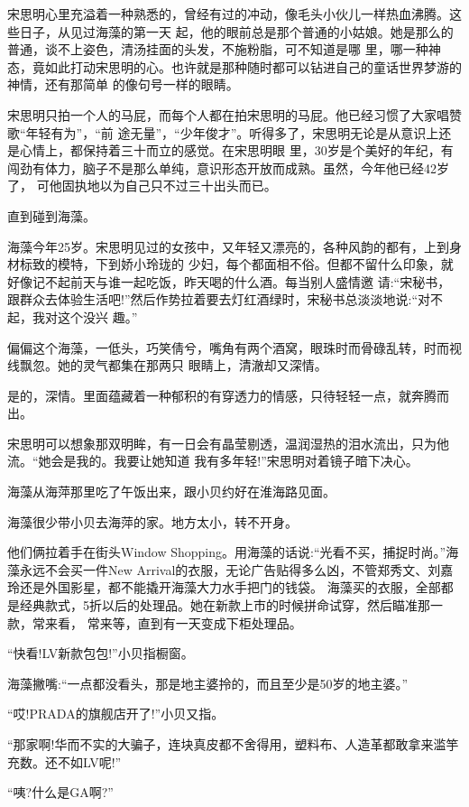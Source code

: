 \documentclass[11pt,a4paper,onecolumn]{article}
\begin{document}
宋思明心里充溢着一种熟悉的，曾经有过的冲动，像毛头小伙儿一样热血沸腾。这些日子，从见过海藻的第一天
起，他的眼前总是那个普通的小姑娘。她是那么的普通，谈不上姿色，清汤挂面的头发，不施粉脂，可不知道是哪
里，哪一种神态，竟如此打动宋思明的心。也许就是那种随时都可以钻进自己的童话世界梦游的神情，还有那简单
的像句号一样的眼睛。

宋思明只拍一个人的马屁，而每个人都在拍宋思明的马屁。他已经习惯了大家唱赞歌\myrule ``年轻有为''，``前
途无量''，``少年俊才''。听得多了，宋思明无论是从意识上还是心情上，都保持着三十而立的感觉。在宋思明眼
里，30岁是个美好的年纪，有闯劲有体力，脑子不是那么单纯，意识形态开放而成熟。虽然，今年他已经42岁了，
可他固执地以为自己只不过三十出头而已。

直到碰到海藻。

海藻今年25岁。宋思明见过的女孩中，又年轻又漂亮的，各种风韵的都有，上到身材标致的模特，下到娇小玲珑的
少妇，每个都面相不俗。但都不留什么印象，就好像记不起前天与谁一起吃饭，昨天喝的什么酒。每当别人盛情邀
请:``宋秘书，跟群众去体验生活吧!''然后作势拉着要去灯红酒绿时，宋秘书总淡淡地说:``对不起，我对这个没兴
趣。''

偏偏这个海藻，一低头，巧笑倩兮，嘴角有两个酒窝，眼珠时而骨碌乱转，时而视线飘忽。她的灵气都集在那两只
眼睛上，清澈却又深情。

是的，深情。里面蕴藏着一种郁积的有穿透力的情感，只待轻轻一点，就奔腾而出。

宋思明可以想象那双明眸，有一日会有晶莹剔透，温润湿热的泪水流出，只为他流。``她会是我的。我要让她知道
我有多年轻!''宋思明对着镜子暗下决心。

海藻从海萍那里吃了午饭出来，跟小贝约好在淮海路见面。

海藻很少带小贝去海萍的家。地方太小，转不开身。

他们俩拉着手在街头Window Shopping。用海藻的话说:``光看不买，捕捉时尚。''海藻永远不会买一件New
Arrival的衣服，无论广告贴得多么凶，不管郑秀文、刘嘉玲还是外国影星，都不能撬开海藻大力水手把门的钱袋。
海藻买的衣服，全部都是经典款式，5折以后的处理品。她在新款上市的时候拼命试穿，然后瞄准那一款，常来看，
常来等，直到有一天变成下柜处理品。

``快看!LV新款包包!''小贝指橱窗。

海藻撇嘴:``一点都没看头，那是地主婆拎的，而且至少是50岁的地主婆。''

``哎!PRADA的旗舰店开了!''小贝又指。

``那家啊!华而不实的大骗子，连块真皮都不舍得用，塑料布、人造革都敢拿来滥竽充数。还不如LV呢!''

``咦?什么是GA啊?''
\end{document}
